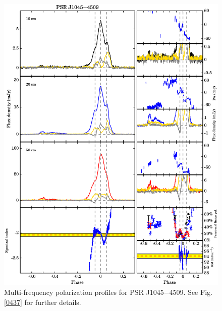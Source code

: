 \documentclass[useAMS,usenatbib]{mn2e}
\begin{document}
\begin{appendix}
\begin{figure}
\begin{center}
\includegraphics[width=6 in]{1045.ps}
\caption{Multi-frequency polarization profiles for PSR J1045$-$4509. 
See Fig. \ref{0437} for further details.}
\label{1045}
\end{center}
\end{figure}


\end{appendix}
\end{document}
